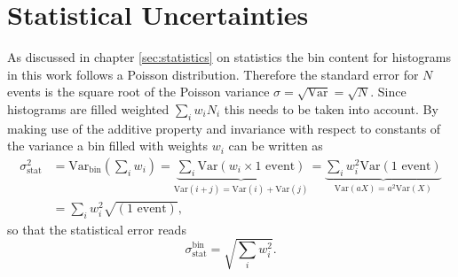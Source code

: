 \section{Statistical Uncertainties}
As discussed in chapter \ref{sec:statistics} on statistics the bin content for histograms in this work follows a Poisson distribution. Therefore the standard error for $N$ events is the square root of the Poisson variance $\sigma=\sqrt{\text{Var}}=\sqrt{N}$. Since histograms are filled weighted $\sum_i w_i N_i$ this needs to be taken into account. By making use of the additive property and invariance with respect to constants of the variance a bin filled with weights $w_i$ can be written as
\begin{align}
    \sigma_\text{stat}^2 & = \text{Var}_\text{bin}\left(\sum_i w_i\right)
    =
    \underbrace{\sum_i \text{Var}(w_i \times 1\text{ event})}_{\text{Var}(i+j)=\text{Var}(i)+\text{Var}(j)}
    =
    \underbrace{\sum_i w_i^2\text{Var}(1\text{ event})}_{\text{Var}(aX)=a^2\text{Var}(X)} \\ \nonumber
                         & =\sum_i w_i^2\sqrt{(1\text{ event})},
\end{align}
so that the statistical error reads
\begin{equation}
    \sigma_\text{stat}^\text{bin}=\sqrt{\sum_i w_i^2}.
\end{equation}

